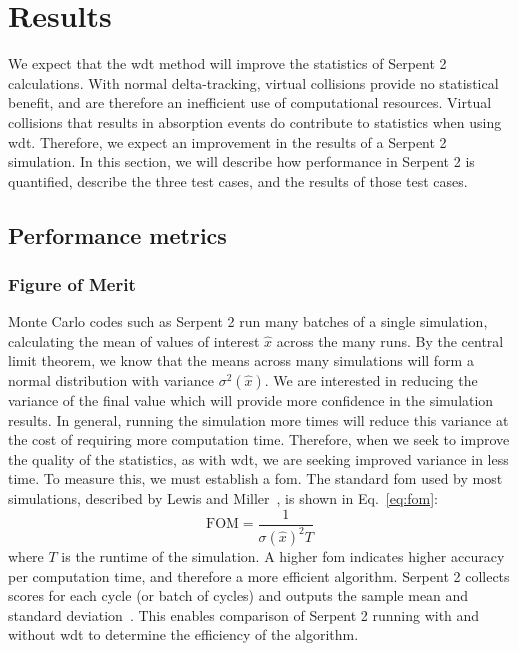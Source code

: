 \chapter{Results}
\label{chap:results}
We expect that the \gls{wdt} method will improve the statistics of
Serpent 2 calculations. With normal delta-tracking, virtual collisions
provide no statistical benefit, and are therefore an inefficient use
of computational resources. Virtual collisions that results in
absorption events do contribute to statistics when using
\gls{wdt}. Therefore, we expect an improvement in the results of a
Serpent 2 simulation. In this section, we will describe how
performance in Serpent 2 is quantified, describe the three test cases,
and the results of those test cases.

\section{Performance metrics}
\label{sec:fom}

\subsection{Figure of Merit}
\label{sec:fom}

Monte Carlo codes such as Serpent 2 run many batches of a single
simulation, calculating the mean of values of interest $\hat{x}$
across the many runs. By the central limit theorem, we know that the
means across many simulations will form a normal distribution with
variance $\sigma^2(\hat{x})$. We are interested in reducing the
variance of the final value which will provide more confidence in the
simulation results. In general, running the simulation more times will
reduce this variance at the cost of requiring more computation
time. Therefore, when we seek to improve the quality of the
statistics, as with \gls{wdt}, we are seeking improved variance in
less time. To measure this, we must establish a \gls{fom}.
The standard \gls{fom} used by most simulations, described by Lewis
and Miller~\cite{lewis1993}, is shown in Eq.~\eqref{eq:fom}:
\begin{equation}
  \label{eq:fom}
  \mathrm{FOM} = \frac{1}{\sigma(\hat{x})^2T}
\end{equation}
where $T$ is the runtime of the simulation. A higher \gls{fom}
indicates higher accuracy per computation time, and therefore a more
efficient algorithm. Serpent 2 collects scores for each cycle (or
batch of cycles) and outputs the sample mean and standard
deviation~\cite{VTT-R-00371-14}. This enables comparison of Serpent 2
running with and without \gls{wdt} to determine the efficiency of the
algorithm.

